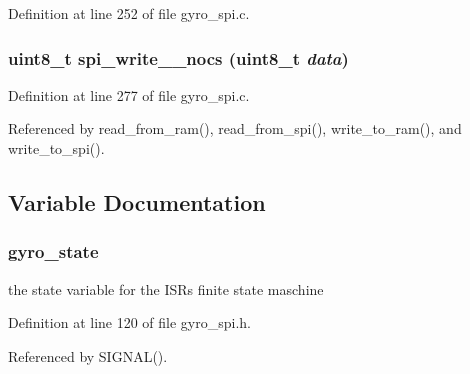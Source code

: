 Definition at line 252 of file gyro\_\-spi.c.
\subsubsection{\setlength{\rightskip}{0pt plus 5cm}uint8\_\-t spi\_\-write\_\_\-nocs (uint8\_\-t {\em data})}\label{group__ro__spi_g749901211df982eb115539d254801df9}




Definition at line 277 of file gyro\_\-spi.c.

Referenced by read\_\-from\_\-ram(), read\_\-from\_\-spi(), write\_\-to\_\-ram(), and write\_\-to\_\-spi().

\subsection{Variable Documentation}
\subsubsection{ {\bf gyro\_\-state}}\label{group__ro__spi_g7487340e71945cd71a75d6fbd8d7fd18}


the state variable for the ISRs finite state maschine 

Definition at line 120 of file gyro\_\-spi.h.

Referenced by SIGNAL().